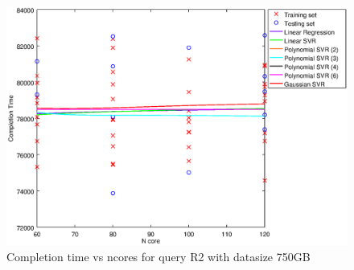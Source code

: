 
\begin {figure}[hbtp]
\centering
\includegraphics[width=\textwidth]{output/R2_750_1_OVER_NCORES/plot_R2_750.eps}
\caption{Completion time vs ncores for query R2 with datasize 750GB}
\label{fig:all_nonlinear_R2_750}
\end {figure}
